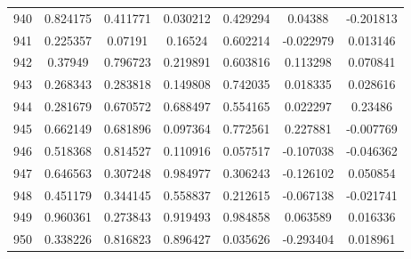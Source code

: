 \begin{table}
\begin{tabular}{c|c|c|c|c|c|c}
940 & 0.824175 & 0.411771 & 0.030212 & 0.429294 & 0.04388 & -0.201813\\
941 & 0.225357 & 0.07191 & 0.16524 & 0.602214 & -0.022979 & 0.013146\\
942 & 0.37949 & 0.796723 & 0.219891 & 0.603816 & 0.113298 & 0.070841\\
943 & 0.268343 & 0.283818 & 0.149808 & 0.742035 & 0.018335 & 0.028616\\
944 & 0.281679 & 0.670572 & 0.688497 & 0.554165 & 0.022297 & 0.23486\\
945 & 0.662149 & 0.681896 & 0.097364 & 0.772561 & 0.227881 & -0.007769\\
946 & 0.518368 & 0.814527 & 0.110916 & 0.057517 & -0.107038 & -0.046362\\
947 & 0.646563 & 0.307248 & 0.984977 & 0.306243 & -0.126102 & 0.050854\\
948 & 0.451179 & 0.344145 & 0.558837 & 0.212615 & -0.067138 & -0.021741\\
949 & 0.960361 & 0.273843 & 0.919493 & 0.984858 & 0.063589 & 0.016336\\
950 & 0.338226 & 0.816823 & 0.896427 & 0.035626 & -0.293404 & 0.018961\\
\end{tabular}
\end{table}
\newpage
